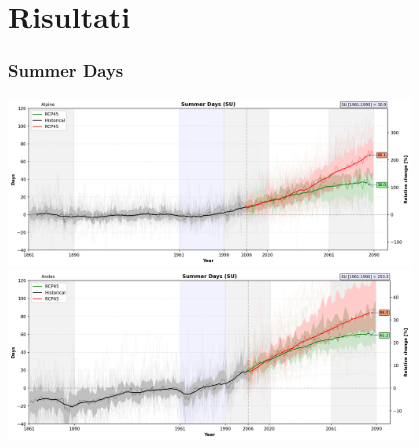 \section{Risultati}

\begin{frame}
\frametitle{Summer Days}
\begin{center}

{\includegraphics[width=0.8\textwidth]{risultati/su_Alpine_Models_ts_lim_120}} 
{\includegraphics[width=0.8\textwidth]{risultati/su_Andes_Models_ts_lim_120}}
\end{center}
\end{frame}

